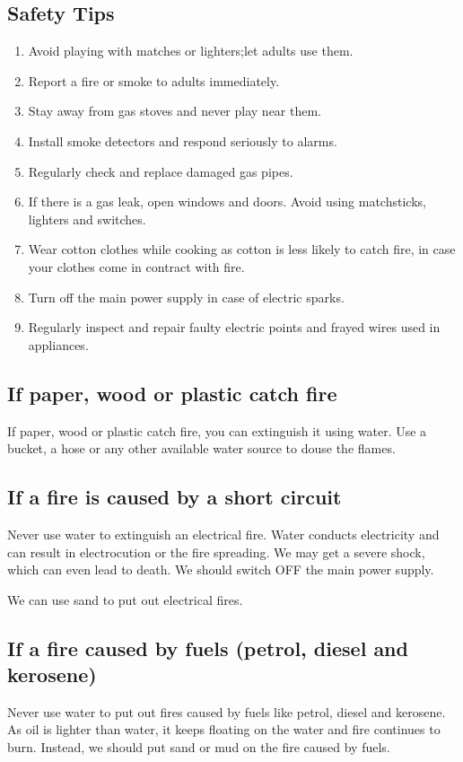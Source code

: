 \subsection{Safety Tips}
\begin{enumerate}
    \item Avoid playing with matches or lighters;let adults use them.
    \item Report a fire or smoke to adults immediately.
    \item Stay away from gas stoves and never play near them.
    \item Install smoke detectors and respond seriously to alarms.
    \item Regularly check and replace damaged gas pipes.
    \item If there is a gas leak, open windows and doors. Avoid using matchsticks, lighters and switches.
    \item Wear cotton clothes while cooking as cotton is less likely to catch fire, in case your clothes come in contract with fire.
    \item Turn off the main power supply in case of electric sparks.
    \item Regularly inspect and repair faulty electric points and frayed wires used in appliances.
\end{enumerate}
\subsection{\textbf{If paper, wood or plastic catch fire}}
If paper, wood or plastic catch fire, you can extinguish it using water. Use a bucket, a hose or any other available water source to douse the flames.
\subsection{\textbf{If a fire is caused by a short circuit}}
Never use water to extinguish an electrical fire. Water conducts electricity and can result in electrocution or the fire spreading. We may get a severe shock, which can even lead to death. We should switch OFF the main power supply.
\vspace{0.1in}
\par
We can use sand to put out electrical fires.
\subsection{\textbf{If a fire caused by fuels (petrol, diesel and kerosene)}}
Never use water to put out fires caused by fuels like petrol, diesel and kerosene. As oil is lighter than water, it keeps floating on the water and fire continues to burn. Instead, we should put sand or mud on the fire caused by fuels.
\vspace{0.4in}
